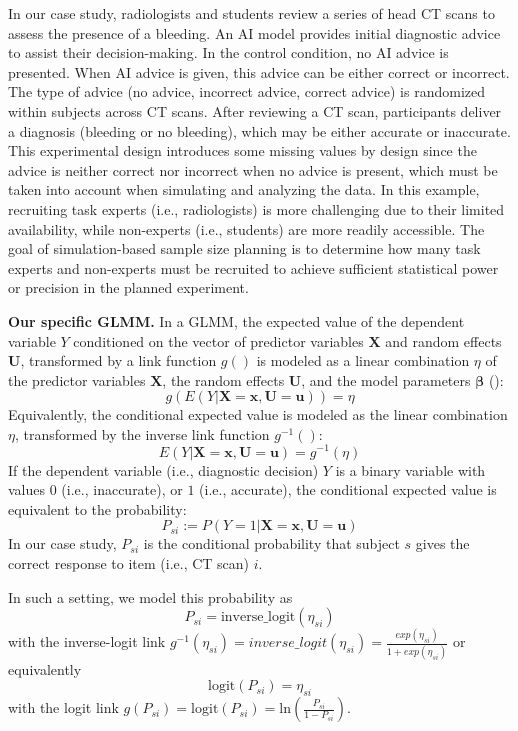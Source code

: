 \documentclass[
  man,
  floatsintext,
  longtable,
  a4paper,
  nolmodern,
  notxfonts,
  notimes,
  colorlinks=true,linkcolor=blue,citecolor=blue,urlcolor=blue]{apa7}
\begin{document}
In our case study, radiologists and students review a series of head CT
scans to assess the presence of a bleeding. An AI model provides initial
diagnostic advice to assist their decision-making. In the control
condition, no AI advice is presented. When AI advice is given, this
advice can be either correct or incorrect. The type of advice (no
advice, incorrect advice, correct advice) is randomized within subjects
across CT scans. After reviewing a CT scan, participants deliver a
diagnosis (bleeding or no bleeding), which may be either accurate or
inaccurate. This experimental design introduces some missing values by
design since the advice is neither correct nor incorrect when no advice
is present, which must be taken into account when simulating and
analyzing the data. In this example, recruiting task experts (i.e.,
radiologists) is more challenging due to their limited availability,
while non-experts (i.e., students) are more readily accessible. The goal
of simulation-based sample size planning is to determine how many task
experts and non-experts must be recruited to achieve sufficient
statistical power or precision in the planned experiment.

\textbf{Our specific GLMM.} In a GLMM, the expected value of the
dependent variable \(Y\) conditioned on the vector of predictor
variables \(\mathbf{X}\) and random effects \(\mathbf{U}\), transformed
by a link function \(g()\) is modeled as a linear combination \(\eta\)
of the predictor variables \(\mathbf{X}\), the random effects
\(\mathbf{U}\), and the model parameters \(\mathbf{\beta}\)
(): \[
g(E(Y|\mathbf{X}=\mathbf{x},\mathbf{U}=\mathbf{u})) = \eta
\] Equivalently, the conditional expected value is modeled as the linear
combination \(\eta\), transformed by the inverse link function
\(g^{-1}()\): \[
E(Y|\mathbf{X}=\mathbf{x},\mathbf{U}=\mathbf{u}) = g^{-1}(\eta)
\] If the dependent variable (i.e., diagnostic decision) \(Y\) is a
binary variable with values \(0\) (i.e., inaccurate), or \(1\) (i.e.,
accurate), the conditional expected value is equivalent to the
probability: \[
P_{si} := P(Y = 1|\mathbf{X}=\mathbf{x},\mathbf{U}=\mathbf{u})
\] In our case study, \(P_{si}\) is the conditional probability that
subject \(s\) gives the correct response to item (i.e., CT scan) \(i\).

In such a setting, we model this probability as \[
P_{si} = \text{inverse\_logit}(\eta_{si})
\] with the inverse-logit link
\(g^{-1}(\eta_{si}) = inverse\_logit(\eta_{si}) = \frac{exp(\eta_{si})}{1 + exp(\eta_{si})}\)
or equivalently \[
\text{logit}(P_{si}) = \eta_{si}
\] with the logit link
\(g(P_{si}) = \text{logit}(P_{si}) = \text{ln} (\frac{P_{si}}{1 - P_{si}})\).
\end{document}
